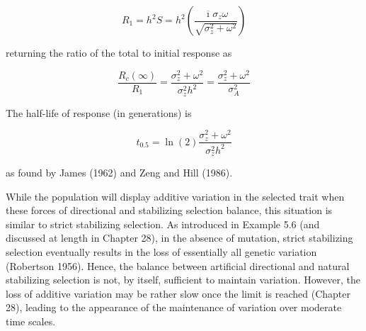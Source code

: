 \documentclass{article}
\begin{document}
\begin{equation}
R_{1}=h^{2}S=h^{2}\left(\frac{\overline{\imath}\sigma_{z}\omega}{\sqrt{\sigma_{z}^{2}+\omega^{2}}}\right)
\tag{25.18b}
\label{eq:25_18b}
\end{equation}

returning the ratio of the total to initial response as

\begin{equation}
\frac{R_{c}(\infty)}{R_{1}}=\frac{\sigma_{z}^{2}+\omega^{2}}{\sigma_{z}^{2}h^{2}}=\frac{\sigma_{z}^{2}+\omega^{2}}{\sigma_{A}^{2}}
\tag{25.18c}
\label{eq:25_18c}
\end{equation}

The half-life of response (in generations) is

\begin{equation}
t_{0.5}=\ln(2)\frac{\sigma_{z}^{2}+\omega^{2}}{\sigma_{z}^{2}h^{2}}
\tag{25.18d}
\label{eq:25_18d}
\end{equation}

as found by James (1962) and Zeng and Hill (1986).

While the population will display additive variation in the selected trait when these forces of directional and stabilizing selection balance, this situation is similar to strict stabilizing selection. As introduced in Example 5.6 (and discussed at length in Chapter 28), in the absence of mutation, strict stabilizing selection eventually results in the loss of essentially all genetic variation (Robertson 1956). Hence, the balance between artificial directional and natural stabilizing selection is not, by itself, sufficient to maintain variation. However, the loss of additive variation may be rather slow once the limit is reached (Chapter 28), leading to the appearance of the maintenance of variation over moderate time scales.
\end{document}
